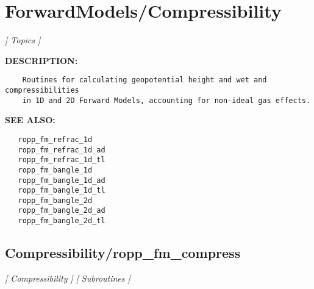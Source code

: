 \section{ForwardModels/Compressibility}
\textsl{[ Topics ]}

\label{ch:robo43}
\label{ch:ForwardModels_Compressibility}
\textbf{DESCRIPTION:}\hspace{0.08in}\begin{Verbatim}
    Routines for calculating geopotential height and wet and compressibilities
    in 1D and 2D Forward Models, accounting for non-ideal gas effects.
\end{Verbatim}
\textbf{SEE ALSO:}\hspace{0.08in}\begin{Verbatim}
   ropp_fm_refrac_1d
   ropp_fm_refrac_1d_ad
   ropp_fm_refrac_1d_tl
   ropp_fm_bangle_1d
   ropp_fm_bangle_1d_ad
   ropp_fm_bangle_1d_tl
   ropp_fm_bangle_2d
   ropp_fm_bangle_2d_ad
   ropp_fm_bangle_2d_tl
\end{Verbatim}
\subsection{Compressibility/ropp\_fm\_compress}
\textsl{[ Compressibility ]}
\textsl{[ Subroutines ]}

